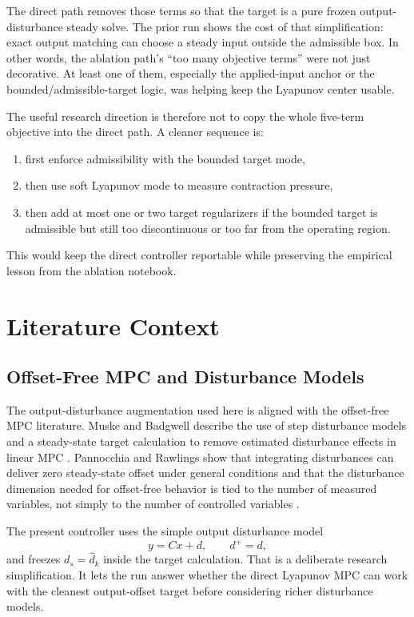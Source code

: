 \documentclass[11pt]{article}
\begin{document}
The direct path removes those terms so that the target is a pure frozen
output-disturbance steady solve. The prior run shows the cost of that
simplification: exact output matching can choose a steady input outside the
admissible box. In other words, the ablation path's ``too many objective terms''
were not just decorative. At least one of them, especially the applied-input
anchor or the bounded/admissible-target logic, was helping keep the Lyapunov
center usable.

The useful research direction is therefore not to copy the whole five-term
objective into the direct path. A cleaner sequence is:
\begin{enumerate}[leftmargin=1.5em]
\item first enforce admissibility with the bounded target mode,
\item then use soft Lyapunov mode to measure contraction pressure,
\item then add at most one or two target regularizers if the bounded target is
admissible but still too discontinuous or too far from the operating region.
\end{enumerate}

This would keep the direct controller reportable while preserving the empirical
lesson from the ablation notebook.

\section{Literature Context}

\subsection{Offset-Free MPC and Disturbance Models}

The output-disturbance augmentation used here is aligned with the offset-free
MPC literature. Muske and Badgwell describe the use of step disturbance models
and a steady-state target calculation to remove estimated disturbance effects in
linear MPC \cite{muske2002}. Pannocchia and Rawlings show that integrating
disturbances can deliver zero steady-state offset under general conditions and
that the disturbance dimension needed for offset-free behavior is tied to the
number of measured variables, not simply to the number of controlled variables
\cite{pannocchia2003}.

The present controller uses the simple output disturbance model
\[
y=Cx+d,\qquad d^+=d,
\]
and freezes \(d_s=\hat d_k\) inside the target calculation. That is a deliberate
research simplification. It lets the run answer whether the direct Lyapunov MPC
can work with the cleanest output-offset target before considering richer
disturbance models.
\end{document}

